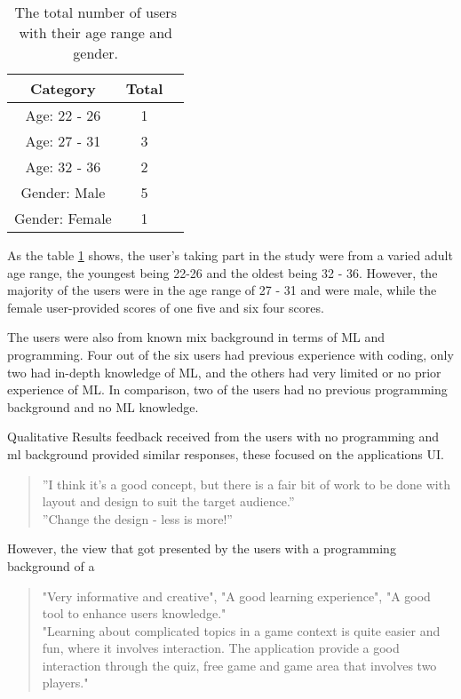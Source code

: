 		\begin{table}[h!]
		\centering
		\begin{tabular}{|c|c|c }
			\hline
			Category & Total \\ 
			\hline
			Age: 22 - 26 & 1 \\ 
			\hline 
			Age: 27 - 31 & 3 \\
			\hline
			Age: 32 - 36 & 2 \\ 
			\hline 
			Gender: Male & 5 \\
			\hline
			Gender: Female & 1 \\ 
			\hline 
			
		\end{tabular}
		\caption{The total number of users with their age range and gender.}
		\label{table:results_age_gender}
	\end{table}
	
	As the table \ref{table:results_age_gender} shows, the user's taking part in the study were from a varied adult age range, the youngest being 22-26 and the oldest being 32 - 36. However, the majority of the users were in the age range of 27 - 31 and were male, while the female user-provided scores of one five and six four scores. 
	
	The users were also from known mix background in terms of ML and programming. Four out of the six users had previous experience with coding, only two had in-depth knowledge of ML, and the others had very limited or no prior experience of ML. In comparison, two of the users had no previous programming background and no ML knowledge.
	
	Qualitative Results feedback received from the users with no programming and ml background provided similar responses, these focused on the applications UI. 
	
	\begin{quote}
		\begin{changebar}
			''I think it's a good concept, but there is a fair bit of work to be done with layout and design to suit the target audience.'' \\
			''Change the design - less is more!''
		\end{changebar}
	\end{quote}
	
	However, the view that got presented by the users with a programming background of a 
	
	\begin{quote}
		\begin{changebar}
			"Very informative and creative", "A good learning experience", "A good tool to enhance users knowledge." 
			\\ "Learning about complicated topics in a game context is quite easier and fun, where it involves interaction. The application provide a good interaction through the quiz, free game and game area that involves two players." 
		\end{changebar}
	\end{quote}

